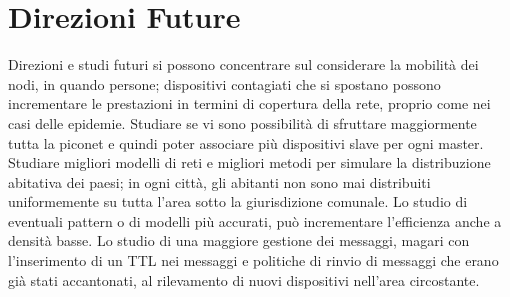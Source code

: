 \chapter{Direzioni Future}
\label{chap:direzioni_future}

Direzioni e studi futuri si possono concentrare sul considerare la mobilità dei nodi, in quando persone; dispositivi contagiati che si spostano possono incrementare le prestazioni in termini di copertura della rete, proprio come nei casi delle epidemie. Studiare se vi sono possibilità di sfruttare maggiormente tutta la piconet e quindi poter associare più dispositivi slave per ogni master. Studiare migliori modelli di reti e migliori metodi per simulare la distribuzione abitativa dei paesi; in ogni città, gli abitanti non sono mai distribuiti uniformemente su tutta l'area sotto la giurisdizione comunale. Lo studio di eventuali pattern o di modelli più accurati, può incrementare l'efficienza anche a densità basse. Lo studio di una maggiore gestione dei messaggi, magari con l'inserimento di un TTL nei messaggi e politiche di rinvio di messaggi che erano già stati accantonati, al rilevamento di nuovi dispositivi nell'area circostante.